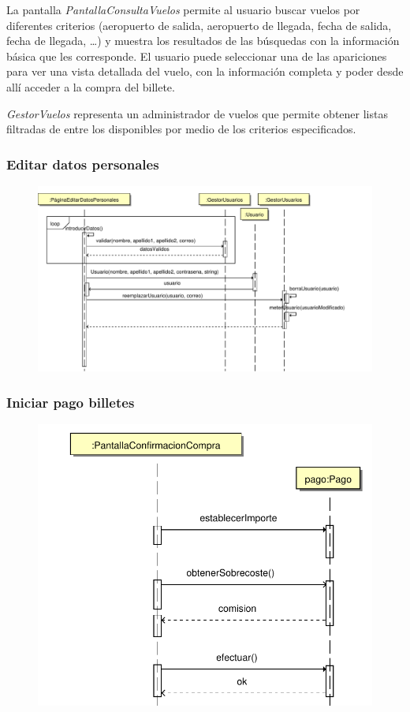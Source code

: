 \documentclass[11pt, a4paper, twoside, titlepage]{article}
\begin{document}
				La pantalla {\itshape PantallaConsultaVuelos} permite al usuario buscar vuelos por diferentes criterios (aeropuerto de salida, aeropuerto de llegada, fecha de salida, fecha de llegada, \ldots) y muestra los resultados de las búsquedas con la información básica que les corresponde. El usuario puede seleccionar una de las apariciones para ver una vista detallada del vuelo, con la información completa y poder desde allí acceder a la compra del billete.

				{\itshape GestorVuelos} representa un administrador de vuelos que permite obtener listas filtradas de entre los disponibles por medio de los criterios especificados.
			
			\subsubsection{Editar datos personales}
				\begin{figure}[H]\centering
					\includegraphics[scale=.6]{diagramas/editardatospersonales.pdf}
				\end{figure}


			\subsubsection{Iniciar pago billetes}
				\begin{figure}[H]\centering
					\includegraphics[scale=.6]{diagramas/iniciarpagobilletes.pdf}
				\end{figure}
\end{document}
